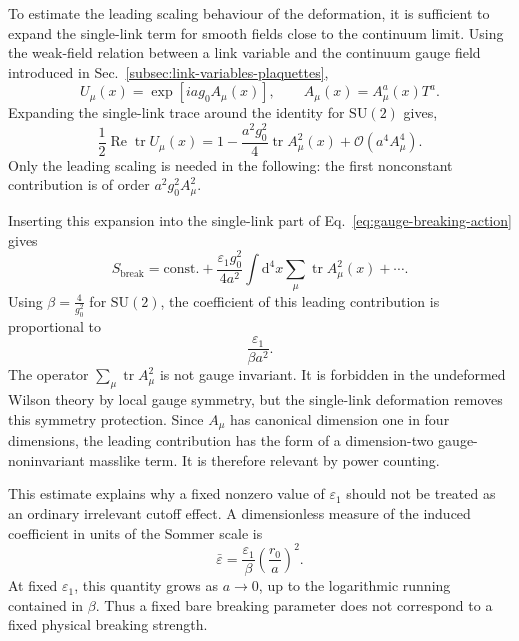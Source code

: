 \documentclass[12pt,a4paper,oneside,numbers=noenddot]{scrreprt}
\newcommand{\SU}{\mathrm{SU}}
\newcommand{\dd}{\mathrm{d}}
\newcommand{\order}{\mathcal{O}}
\newcommand{\eps}{\varepsilon}
\newcommand{\latspacing}{a}
\newcommand{\rzero}{r_0}
\begin{document}
To estimate the leading scaling behaviour of the deformation, it is sufficient
to expand the single-link term for smooth fields close to the continuum limit.
Using the weak-field relation between a link variable and the continuum gauge
field introduced in Sec.~\ref{subsec:link-variables-plaquettes},
\begin{equation}
  U_\mu(x)
  =
  \exp\!\left[
    i\latspacing g_0 A_\mu(x)
  \right],
  \qquad
  A_\mu(x)=A_\mu^a(x)T^a .
  \label{eq:weak-field-link-breaking}
\end{equation}
Expanding the single-link trace around the identity for \(\SU(2)\) gives,
\begin{equation}
  \frac{1}{2}
  \operatorname{Re}\operatorname{tr}U_\mu(x)
  =
  1
  -
  \frac{\latspacing^2 g_0^2}{4}
  \operatorname{tr}A_\mu^2(x)
  +
  \order(\latspacing^4 A_\mu^4).
  \label{eq:weak-field-single-link-trace}
\end{equation}
Only the leading scaling is needed in the following: the first nonconstant
contribution is of order \(\latspacing^2 g_0^2 A_\mu^2\).

Inserting this expansion into the single-link part of
Eq.~\eqref{eq:gauge-breaking-action} gives
\begin{equation}
  S_{\mathrm{break}}
  =
  \mathrm{const.}
  +
  \frac{\eps_1 g_0^2}{4\latspacing^2}
  \int \dd^4x
  \sum_\mu
  \operatorname{tr}A_\mu^2(x)
  +
  \cdots .
  \label{eq:single-link-masslike-term}
\end{equation}
Using \(\beta=\frac{4}{g_0^2}\) for \(\SU(2)\), the coefficient of this leading
contribution is proportional to 
\begin{equation}
  \frac{\eps_1}{\beta\latspacing^2}.
  \label{eq:masslike-coefficient}
\end{equation}
The operator $\sum_\mu \operatorname{tr}A_\mu^2$
is not gauge invariant. It is forbidden in the undeformed Wilson theory by
local gauge symmetry, but the single-link deformation removes this symmetry
protection. Since \(A_\mu\) has canonical dimension one in four dimensions, the
leading contribution has the form of a dimension-two gauge-noninvariant
masslike term. It is therefore relevant by power counting.

This estimate explains why a fixed nonzero value of \(\eps_1\) should not be
treated as an ordinary irrelevant cutoff effect. A dimensionless measure of the
induced coefficient in units of the Sommer scale is
\begin{equation}
  \bar\eps
  =
  \frac{\eps_1}{\beta}
  \left(
    \frac{\rzero}{\latspacing}
  \right)^2 .
  \label{eq:epsilon-bar}
\end{equation}
At fixed \(\eps_1\), this quantity grows as \(\latspacing\to0\), up to the
logarithmic running contained in \(\beta\). Thus a fixed bare breaking parameter
does not correspond to a fixed physical breaking strength.
\end{document}

